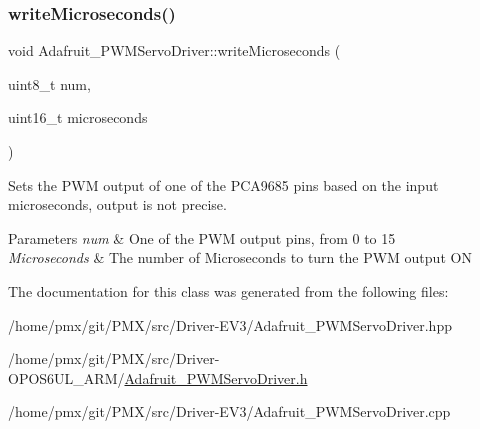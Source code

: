 \subsubsection{\texorpdfstring{write\+Microseconds()}{writeMicroseconds()}}
{\footnotesize\ttfamily void Adafruit\+\_\+\+P\+W\+M\+Servo\+Driver\+::write\+Microseconds (\begin{DoxyParamCaption}\item[{uint8\+\_\+t}]{num,  }\item[{uint16\+\_\+t}]{microseconds }\end{DoxyParamCaption})}



Sets the P\+WM output of one of the P\+C\+A9685 pins based on the input microseconds, output is not precise. 


\begin{DoxyParams}{Parameters}
{\em num} & One of the P\+WM output pins, from 0 to 15 \\
\hline
{\em Microseconds} & The number of Microseconds to turn the P\+WM output ON \\
\hline
\end{DoxyParams}


The documentation for this class was generated from the following files\+:\begin{DoxyCompactItemize}
\item 
/home/pmx/git/\+P\+M\+X/src/\+Driver-\/\+E\+V3/Adafruit\+\_\+\+P\+W\+M\+Servo\+Driver.\+hpp\item 
/home/pmx/git/\+P\+M\+X/src/\+Driver-\/\+O\+P\+O\+S6\+U\+L\+\_\+\+A\+R\+M/\hyperlink{Adafruit__PWMServoDriver_8h}{Adafruit\+\_\+\+P\+W\+M\+Servo\+Driver.\+h}\item 
/home/pmx/git/\+P\+M\+X/src/\+Driver-\/\+E\+V3/Adafruit\+\_\+\+P\+W\+M\+Servo\+Driver.\+cpp\end{DoxyCompactItemize}
